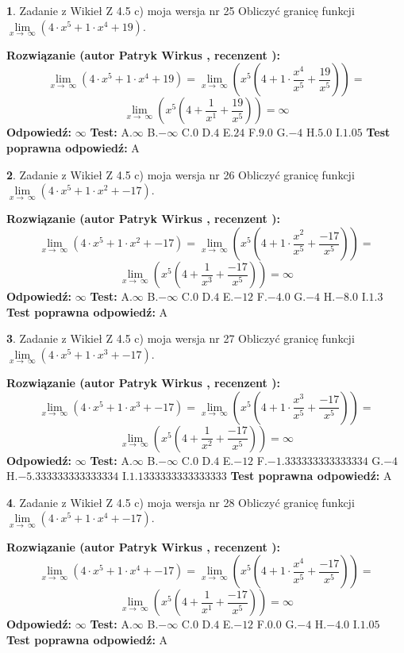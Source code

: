 \documentclass[12pt, a4paper]{article}
\theoremstyle{definition} %
\newtheorem{zad}{}
\newcommand{\zadStart}[1]{\begin{zad}#1\newline}
\newcommand{\zadStop}{\end{zad}}
\newcommand{\rozwStart}[2]{\noindent \textbf{Rozwiązanie (autor #1 , recenzent #2): }\newline}
\newcommand{\rozwStop}{\newline}
\newcommand{\odpStart}{\noindent \textbf{Odpowiedź:}\newline}
\newcommand{\odpStop}{\newline}
\newcommand{\testStart}{\noindent \textbf{Test:}\newline}
\newcommand{\testStop}{\newline}
\newcommand{\kluczStart}{\noindent \textbf{Test poprawna odpowiedź:}\newline}
\newcommand{\kluczStop}{\newline}
\begin{document}
\zadStart{Zadanie z Wikieł Z 4.5 c) moja wersja nr 25}
Obliczyć granicę funkcji  $\lim\limits_{x\to\ \infty}(4 \cdot x^{5}+1 \cdot x^{4}+19)$.
\zadStop
\rozwStart{Patryk Wirkus}{}
$$\lim\limits_{x\to\ \infty}(4 \cdot x^{5}+1 \cdot x^{4}+19) = \lim\limits_{x\to\ \infty}(x^{5}(4 +1 \cdot \frac{x^{4}}{x^{5}}+\frac{19}{x^{5}})) =$$ $$\lim\limits_{x\to\ \infty}(x^{5}(4 +\frac{1}{x^{1}}+\frac{19}{x^{5}})) =\infty$$
\rozwStop
\odpStart
$\infty$
\odpStop
\testStart
A.$\infty$ B.$-\infty$ C.$0$ D.$4$ E.$24$
F.$9.0$ G.$-4$
H.$5.0$
I.$1.05$
\testStop
\kluczStart
A
\kluczStop



\zadStart{Zadanie z Wikieł Z 4.5 c) moja wersja nr 26}
Obliczyć granicę funkcji  $\lim\limits_{x\to\ \infty}(4 \cdot x^{5}+1 \cdot x^{2}+-17)$.
\zadStop
\rozwStart{Patryk Wirkus}{}
$$\lim\limits_{x\to\ \infty}(4 \cdot x^{5}+1 \cdot x^{2}+-17) = \lim\limits_{x\to\ \infty}(x^{5}(4 +1 \cdot \frac{x^{2}}{x^{5}}+\frac{-17}{x^{5}})) =$$ $$\lim\limits_{x\to\ \infty}(x^{5}(4 +\frac{1}{x^{3}}+\frac{-17}{x^{5}})) =\infty$$
\rozwStop
\odpStart
$\infty$
\odpStop
\testStart
A.$\infty$ B.$-\infty$ C.$0$ D.$4$ E.$-12$
F.$-4.0$ G.$-4$
H.$-8.0$
I.$1.3$
\testStop
\kluczStart
A
\kluczStop



\zadStart{Zadanie z Wikieł Z 4.5 c) moja wersja nr 27}
Obliczyć granicę funkcji  $\lim\limits_{x\to\ \infty}(4 \cdot x^{5}+1 \cdot x^{3}+-17)$.
\zadStop
\rozwStart{Patryk Wirkus}{}
$$\lim\limits_{x\to\ \infty}(4 \cdot x^{5}+1 \cdot x^{3}+-17) = \lim\limits_{x\to\ \infty}(x^{5}(4 +1 \cdot \frac{x^{3}}{x^{5}}+\frac{-17}{x^{5}})) =$$ $$\lim\limits_{x\to\ \infty}(x^{5}(4 +\frac{1}{x^{2}}+\frac{-17}{x^{5}})) =\infty$$
\rozwStop
\odpStart
$\infty$
\odpStop
\testStart
A.$\infty$ B.$-\infty$ C.$0$ D.$4$ E.$-12$
F.$-1.333333333333334$ G.$-4$
H.$-5.333333333333334$
I.$1.1333333333333333$
\testStop
\kluczStart
A
\kluczStop



\zadStart{Zadanie z Wikieł Z 4.5 c) moja wersja nr 28}
Obliczyć granicę funkcji  $\lim\limits_{x\to\ \infty}(4 \cdot x^{5}+1 \cdot x^{4}+-17)$.
\zadStop
\rozwStart{Patryk Wirkus}{}
$$\lim\limits_{x\to\ \infty}(4 \cdot x^{5}+1 \cdot x^{4}+-17) = \lim\limits_{x\to\ \infty}(x^{5}(4 +1 \cdot \frac{x^{4}}{x^{5}}+\frac{-17}{x^{5}})) =$$ $$\lim\limits_{x\to\ \infty}(x^{5}(4 +\frac{1}{x^{1}}+\frac{-17}{x^{5}})) =\infty$$
\rozwStop
\odpStart
$\infty$
\odpStop
\testStart
A.$\infty$ B.$-\infty$ C.$0$ D.$4$ E.$-12$
F.$0.0$ G.$-4$
H.$-4.0$
I.$1.05$
\testStop
\kluczStart
A
\kluczStop
\end{document}

